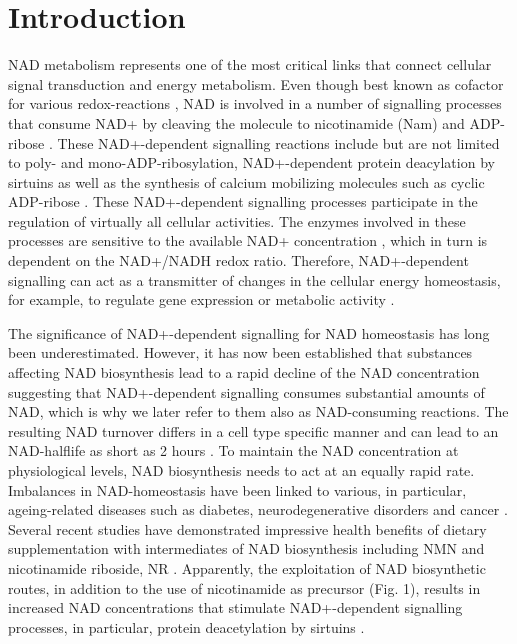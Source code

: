
\section{Introduction}

NAD metabolism represents one of the most critical links that connect cellular signal transduction and energy metabolism. Even though best known as cofactor for various redox-reactions , NAD is involved in a number of signalling processes that consume NAD+ by cleaving the molecule to nicotinamide (Nam) and ADP-ribose \cite{Verdin2015}. These NAD+-dependent signalling reactions include but are not limited to poly- and mono-ADP-ribosylation, NAD+-dependent protein deacylation by sirtuins as well as the synthesis of calcium mobilizing molecules such as cyclic ADP-ribose \cite{Opitz2015}. These NAD+-dependent signalling processes participate in the regulation of virtually all cellular activities. The enzymes involved in these processes are sensitive to the available NAD+ concentration \cite{Ruggieri2015}, which in turn is dependent on the NAD+/NADH redox ratio. Therefore, NAD+-dependent signalling can act as a transmitter of changes in the cellular energy homeostasis, for example, to regulate gene expression or metabolic activity \cite{Koch-Nolte2009}.

The significance of NAD+-dependent signalling for NAD homeostasis has long been underestimated. However, it has now been established that substances affecting NAD biosynthesis lead to a rapid decline of the NAD concentration \cite{Buonvicino2018} suggesting that NAD+-dependent signalling consumes substantial amounts of NAD, which is why we later refer to them also as NAD-consuming reactions. The resulting NAD turnover differs in a cell type specific manner and can lead to an NAD-halflife as short as 2 hours \cite{Liu2018}. To maintain the NAD concentration at physiological levels, NAD biosynthesis needs to act at an equally rapid rate. Imbalances in NAD-homeostasis have been linked to various, in particular, ageing-related diseases such as diabetes, neurodegenerative disorders and cancer \cite{Chiarugi2012,Verdin2015}. Several recent studies have demonstrated impressive health benefits of dietary supplementation with intermediates of NAD biosynthesis including NMN and nicotinamide riboside, NR \cite{Yoshino2018}. Apparently, the exploitation of NAD biosynthetic routes, in addition to the use of nicotinamide as precursor (Fig. 1), results in increased NAD concentrations that stimulate NAD+-dependent signalling processes, in particular, protein deacetylation by sirtuins \cite{North2004}.

